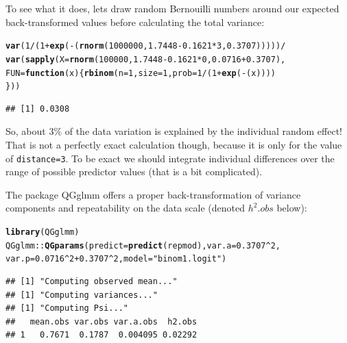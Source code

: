 \documentclass[12pt,a4paper]{scrartcl}\usepackage[]{graphicx}\usepackage[]{color}
\makeatletter
\newcommand{\hlnum}[1]{\textcolor[rgb]{0.686,0.059,0.569}{#1}}%
\newcommand{\hlstr}[1]{\textcolor[rgb]{0.192,0.494,0.8}{#1}}%
\newcommand{\hlopt}[1]{\textcolor[rgb]{0,0,0}{#1}}%
\newcommand{\hlstd}[1]{\textcolor[rgb]{0.345,0.345,0.345}{#1}}%
\newcommand{\hlkwa}[1]{\textcolor[rgb]{0.161,0.373,0.58}{\textbf{#1}}}%
\newcommand{\hlkwc}[1]{\textcolor[rgb]{0.333,0.667,0.333}{#1}}%
\newcommand{\hlkwd}[1]{\textcolor[rgb]{0.737,0.353,0.396}{\textbf{#1}}}%
\newenvironment{kframe}{%
 \def\at@end@of@kframe{}%
 \ifinner\ifhmode%
  \def\at@end@of@kframe{\end{minipage}}%
  \begin{minipage}{\columnwidth}%
 \fi\fi%
 \def\FrameCommand##1{\hskip\@totalleftmargin \hskip-\fboxsep
 \colorbox{shadecolor}{##1}\hskip-\fboxsep
     \hskip-\linewidth \hskip-\@totalleftmargin \hskip\columnwidth}%
 \MakeFramed {\advance\hsize-\width
   \@totalleftmargin\z@ \linewidth\hsize
   \@setminipage}}%
 {\par\unskip\endMakeFramed%
 \at@end@of@kframe}
\newenvironment{knitrout}{}{} %
\makeatother
\begin{document}
\begin{Answer}
To see what it does, lets draw random Bernouilli numbers around our expected back-transformed values before calculating the total variance:
\begin{knitrout}
\color{fgcolor}\begin{kframe}
\begin{alltt}
\hlkwd{var}\hlstd{(}\hlnum{1}\hlopt{/}\hlstd{(}\hlnum{1}\hlopt{+}\hlkwd{exp}\hlstd{(}\hlopt{-}\hlstd{(}\hlkwd{rnorm}\hlstd{(}\hlnum{1000000}\hlstd{,} \hlnum{1.7448}\hlopt{-}\hlnum{0.1621}\hlopt{*}\hlnum{3}\hlstd{,} \hlnum{0.3707}\hlstd{)))))} \hlopt{/}
  \hlkwd{var}\hlstd{(}\hlkwd{sapply}\hlstd{(}\hlkwc{X} \hlstd{=} \hlkwd{rnorm}\hlstd{(}\hlnum{100000}\hlstd{,} \hlnum{1.7448}\hlopt{-}\hlnum{0.1621}\hlopt{*}\hlnum{0}\hlstd{,} \hlnum{0.0716}\hlopt{+}\hlnum{0.3707}\hlstd{),}
        \hlkwc{FUN}\hlstd{=}\hlkwa{function}\hlstd{(}\hlkwc{x}\hlstd{)\{}\hlkwd{rbinom}\hlstd{(}\hlkwc{n} \hlstd{=} \hlnum{1}\hlstd{,} \hlkwc{size} \hlstd{=} \hlnum{1}\hlstd{,} \hlkwc{prob} \hlstd{=} \hlnum{1}\hlopt{/}\hlstd{(}\hlnum{1}\hlopt{+}\hlkwd{exp}\hlstd{(}\hlopt{-}\hlstd{(x))))}
                        \hlstd{\}))}
\end{alltt}
\begin{verbatim}
## [1] 0.0308
\end{verbatim}
\end{kframe}
\end{knitrout}

So, about 3\% of the data variation is explained by the individual random effect! That is not a perfectly exact calculation though, because it is only for the value of \texttt{distance=3}. To be exact we should integrate individual differences over the range of possible predictor values (that is a bit complicated).

The package QGglmm offers a proper back-transformation of variance components and repeatability on the data scale (denoted $h^2.obs$ below):
\begin{knitrout}
\color{fgcolor}\begin{kframe}
\begin{alltt}
\hlkwd{library}\hlstd{(QGglmm)}
\hlstd{QGglmm}\hlopt{::}\hlkwd{QGparams}\hlstd{(}\hlkwc{predict} \hlstd{=} \hlkwd{predict}\hlstd{(repmod),}\hlkwc{var.a} \hlstd{=} \hlnum{0.3707}\hlopt{^}\hlnum{2}\hlstd{,}
                 \hlkwc{var.p} \hlstd{=} \hlnum{0.0716}\hlopt{^}\hlnum{2}\hlopt{+}\hlnum{0.3707}\hlopt{^}\hlnum{2}\hlstd{,} \hlkwc{model} \hlstd{=} \hlstr{"binom1.logit"}\hlstd{)}
\end{alltt}
\begin{verbatim}
## [1] "Computing observed mean..."
## [1] "Computing variances..."
## [1] "Computing Psi..."
##   mean.obs var.obs var.a.obs  h2.obs
## 1   0.7671  0.1787  0.004095 0.02292
\end{verbatim}
\end{kframe}
\end{knitrout}

\end{Answer}
\end{document}
